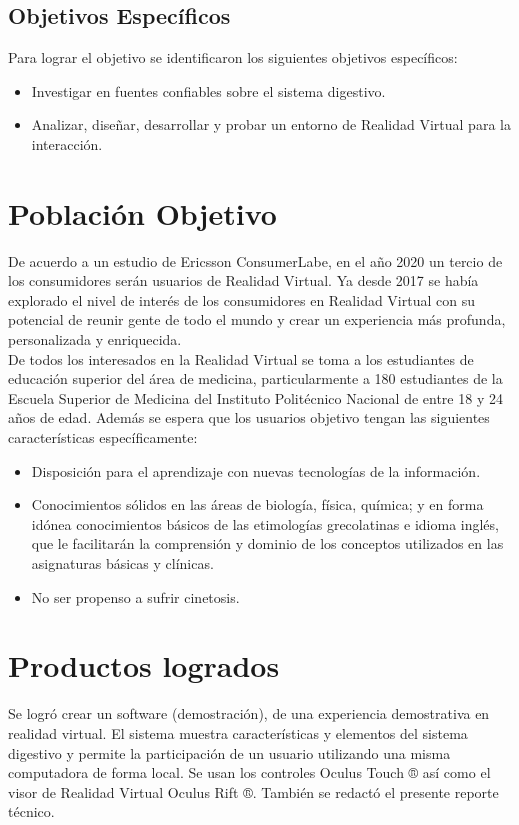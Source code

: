 \subsection{Objetivos Específicos}
Para lograr el objetivo se identificaron los siguientes objetivos específicos:
\newline
\begin{itemize}
\item Investigar en fuentes confiables sobre el sistema digestivo.
\item Analizar, diseñar, desarrollar y probar un entorno de Realidad Virtual para la interacción.
\end{itemize}

\section{Población Objetivo}
De acuerdo a un estudio de Ericsson ConsumerLabe\cite{web3}, en el año 2020 un tercio de los consumidores serán usuarios de Realidad Virtual. Ya desde 2017 se había explorado el nivel de interés de los consumidores en Realidad Virtual\cite{web4} con su potencial de reunir gente de todo el mundo y crear un experiencia más profunda, personalizada y enriquecida.\\
\newline
De todos los interesados en la Realidad Virtual se toma a los estudiantes de educación superior del área de medicina, particularmente a 180\cite{ofi1}  estudiantes de la Escuela Superior de Medicina del Instituto Politécnico Nacional de entre 18 y 24 años de edad. Además se espera que los usuarios objetivo tengan las siguientes características\cite{web5} específicamente:\\
\newline
\begin{itemize}
\item Disposición para el aprendizaje con nuevas tecnologías de la información.
\item Conocimientos sólidos en las áreas de biología, física, química; y en forma idónea conocimientos básicos de las etimologías grecolatinas e idioma inglés, que le facilitarán la comprensión y dominio de los conceptos utilizados en las asignaturas básicas y clínicas.
\item No ser propenso a sufrir cinetosis.
\end{itemize}

\section{Productos logrados}
Se logró crear un software (demostración), de una experiencia demostrativa en realidad virtual. El sistema muestra características y elementos del sistema digestivo y permite la participación de un usuario utilizando una misma computadora de forma local. Se usan los controles Oculus Touch ® así como el visor de Realidad Virtual Oculus Rift ®. También se redactó el presente reporte técnico.

